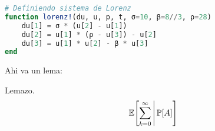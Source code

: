\begin{lstlisting}[language=julia, caption=Aplicando algoritmo de cifrado]
# Definiendo sistema de Lorenz
function lorenz!(du, u, p, t, σ=10, β=8//3, ρ=28)
    du[1] = σ * (u[2] - u[1])
    du[2] = u[1] * (ρ - u[3]) - u[2]
    du[3] = u[1] * u[2] - β * u[3]
end
\end{lstlisting}

Ahi va un lema:

\begin{lemma}{}{}
	Lemazo.
	\begin{equation}
		\E*{\sum_{k=0}^{\infty} \vertsep \Pe{A} }
	\end{equation}
\end{lemma}

